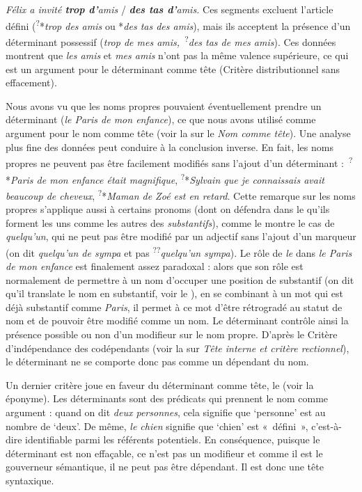 \ea \textit{{Félix a invité} \textbf{{trop d’}}{amis}} / \textit{\textbf{{des tas d’}}{amis.}}\z
Ces segments excluent l’article défini (\textsuperscript{?}*\textit{trop des amis} ou *\textit{des tas des amis}), mais ils acceptent la présence d’un déterminant possessif (\textit{trop de mes amis,~}\textsuperscript{?}\textit{des tas de mes amis}). Ces données montrent que \textit{les amis} et \textit{mes amis} n’ont pas la même valence supérieure, ce qui est un argument pour le déterminant comme tête (Critère distributionnel sans effacement).

Nous avons vu que les noms propres pouvaient éventuellement prendre un déterminant (\textit{le Paris de mon enfance}), ce que nous avons utilisé comme argument pour le nom comme tête (voir la  sur le \textit{Nom comme tête}). Une analyse plus fine des données peut conduire à la conclusion inverse. En fait, les noms propres ne peuvent pas être facilement modifiés sans l’ajout d’un déterminant :~\textsuperscript{?}*\textit{Paris de mon enfance était magnifique}, \textsuperscript{?}*\textit{Sylvain que je connaissais avait beaucoup de cheveux}, \textsuperscript{?}*\textit{Maman de Zoé est en retard}. Cette remarque sur les noms propres s'applique aussi à certains pronoms (dont on défendra dans le  qu'ils forment les uns comme les autres des \textit{substantifs}), comme le montre le cas de \textit{quelqu’un}, qui ne peut pas être modifié par un adjectif sans l’ajout d’un marqueur (on dit \textit{quelqu’un de sympa} et pas \textsuperscript{??}\textit{quelqu’un sympa}). Le rôle de \textit{le} dans \textit{le Paris de mon enfance} est finalement assez paradoxal : alors que son rôle est normalement de permettre à un nom d’occuper une position de substantif (on dit qu’il translate le nom en substantif, voir le ), en se combinant à un mot qui est déjà substantif comme \textit{Paris}, il permet à ce mot d’être rétrogradé au statut de nom et de pouvoir être modifié comme un nom. Le déterminant contrôle ainsi la présence possible ou non d'un modifieur sur le nom propre. D'après le {Critère d'indépendance des codépendants} (voir la  sur \textit{Tête interne et critère rectionnel}), le déterminant ne se comporte donc pas comme un dépendant du nom.

Un dernier critère joue en faveur du déterminant comme tête, le  (voir la  éponyme). Les déterminants sont des prédicats qui prennent le nom comme argument : quand on dit \textit{deux personnes}, cela signifie que ‘personne’ est au nombre de ‘deux’. De même, \textit{le chien} signifie que ‘chien’ est «~défini~», c’est-à-dire identifiable parmi les référents potentiels. En conséquence, puisque le déterminant est non effaçable, ce n’est pas un modifieur et comme il est le gouverneur sémantique, il ne peut pas être dépendant. Il est donc une tête syntaxique.

